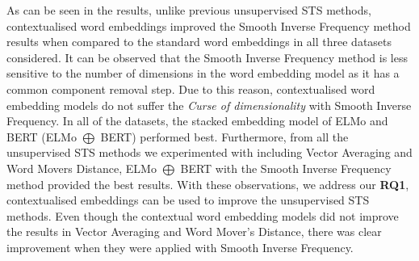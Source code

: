 \begin{enumerate}
\begin{table}[htb]
	\centering
	\caption[Results for QUORA with Smooth Inverse Frequency]{Results for QUORA dataset with Smooth Inverse Frequency. For each word embedding model, Root Mean Squared Error (RMSE) is reported. $\bigoplus$ indicates a stacked word embedding model. The best result from all of the variations is marked with ${\dagger}$.}  
	\label{tab:quora_smooth_inverse}
\end{table}


As can be seen in the results, unlike previous unsupervised STS methods, contextualised word embeddings improved the Smooth Inverse Frequency method results when compared to the standard word embeddings in all three datasets considered. It can be observed that the Smooth Inverse Frequency method is less sensitive to the number of dimensions in the word embedding model as it has a common component removal step. Due to this reason, contextualised word embedding models do not suffer the \textit{Curse of dimensionality} \autocite{10.1145/276698.276876} with Smooth Inverse Frequency. In all of the datasets, the stacked embedding model of ELMo and BERT (ELMo $\bigoplus$ BERT) performed best. Furthermore, from all the unsupervised STS methods we experimented with including Vector Averaging and Word Movers Distance, ELMo $\bigoplus$ BERT with the Smooth Inverse Frequency method provided the best results. With these observations, we address our \textbf{RQ1}, contextualised embeddings can be used to improve the unsupervised STS methods. Even though the contextual word embedding models did not improve the results in Vector Averaging and Word Mover's Distance, there was clear improvement when they were applied with Smooth Inverse Frequency. 


\end{enumerate}
